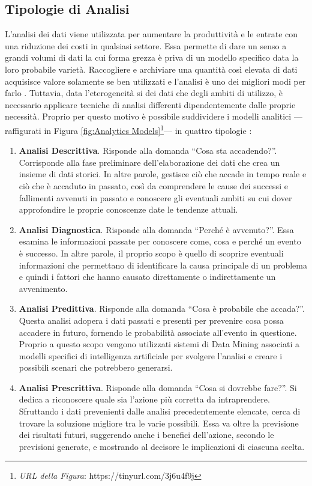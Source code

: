 \subsection{Tipologie di Analisi}
L'analisi dei dati viene utilizzata per aumentare la produttività e le entrate con una riduzione dei costi in qualsiasi settore. Essa permette di dare un senso a grandi volumi di dati la cui forma grezza è priva di un modello specifico data la loro probabile varietà. Raccogliere e archiviare una quantità così elevata di dati acquisisce valore solamente se ben utilizzati e l'analisi è uno dei migliori modi per farlo \cite{researchgate_big_data_analytics}.
Tuttavia, data l'eterogeneità si dei dati che degli ambiti di utilizzo, è necessario applicare tecniche di analisi differenti dipendentemente dalle proprie necessità. Proprio per questo motivo è possibile suddividere i modelli analitici ––raffigurati in Figura \ref{fig:Analytics Models}\footnote{\textit{URL della Figura}: https://tinyurl.com/3j6u4f9j}–– in quattro tipologie \cite{big_data_analytics_harnessing_data_for_new_business_models}:

\begin{enumerate}
    \item \textbf{Analisi Descrittiva}. Risponde alla domanda “Cosa sta accadendo?”. Corrisponde alla fase preliminare dell'elaborazione dei dati che crea un insieme di dati storici. In altre parole, gestisce ciò che accade in tempo reale e ciò che è accaduto in passato, così da comprendere le cause dei successi e fallimenti avvenuti in passato e conoscere gli eventuali ambiti su cui dover approfondire le proprie conoscenze date le tendenze attuali.
    \item \textbf{Analisi Diagnostica}. Risponde alla domanda “Perché è avvenuto?”. Essa esamina le informazioni passate per conoscere come, cosa e perché un evento è successo. In altre parole, il proprio scopo è quello di scoprire eventuali informazioni che permettano di identificare la causa principale di un problema e quindi i fattori che hanno causato direttamente o indirettamente un avvenimento.
    \item \textbf{Analisi Predittiva}. Risponde alla domanda “Cosa è probabile che accada?”. Questa analisi adopera i dati passati e presenti per prevenire cosa possa accadere in futuro, fornendo le probabilità associate all'evento in questione. Proprio a questo scopo vengono utilizzati sistemi di Data Mining associati a modelli specifici di intelligenza artificiale per svolgere l'analisi e creare i possibili scenari che potrebbero generarsi.
    \item \textbf{Analisi Prescrittiva}. Risponde alla domanda “Cosa si dovrebbe fare?”. Si dedica a riconoscere quale sia l'azione più corretta da intraprendere. Sfruttando i dati prevenienti dalle analisi precedentemente elencate, cerca di trovare la soluzione migliore tra le varie possibili. Essa va oltre la previsione dei risultati futuri, suggerendo anche i benefici dell'azione, secondo le previsioni generate, e mostrando al decisore le implicazioni di ciascuna scelta.
\end{enumerate}

